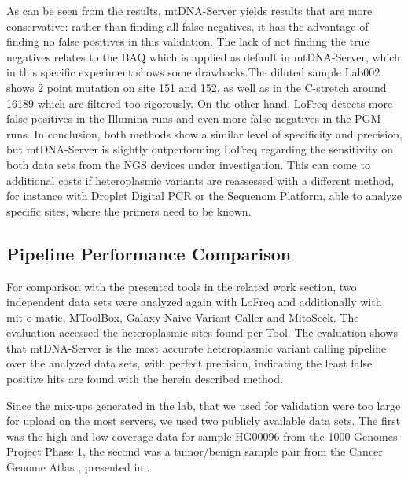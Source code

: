 As can be seen from the results, mtDNA-Server yields results that are more conservative: rather than finding all false negatives, it has the advantage of finding no false positives in this validation. The lack of not finding the true negatives relates to the BAQ which is applied as default in mtDNA-Server, which in this specific experiment shows some drawbacks.The diluted sample Lab002 shows 2 point mutation on site 151 and 152, as well as in the C-stretch around 16189 which are filtered too rigorously. On the other hand, LoFreq detects more false positives in the Illumina runs and even more false negatives in the PGM runs. In conclusion, both methods show a similar level of specificity and precision, but mtDNA-Server is slightly outperforming LoFreq regarding the sensitivity on both data sets from the NGS devices under investigation. This can come to additional costs if heteroplasmic variants are reassessed with a different method, for instance with Droplet Digital PCR or the Sequenom Platform, able to analyze specific sites, where the primers need to be known. 
\subsection{ Pipeline Performance Comparison }
For comparison with the presented tools in the related work section, two independent data sets were analyzed again with LoFreq and additionally with mit-o-matic, MToolBox, Galaxy Naive Variant Caller and  MitoSeek. The evaluation accessed the heteroplasmic sites found per Tool. The evaluation shows that mtDNA-Server is the most accurate heteroplasmic variant calling pipeline over the analyzed data sets, with perfect precision, indicating the least false positive hits are found with the herein described method.

Since the mix-ups generated in the lab, that we used for validation were too large for upload on the most servers, we used two publicly available data sets. The first was the high and low coverage data for sample HG00096 from the 1000 Genomes Project Phase 1, the second was a tumor/benign sample pair from the Cancer Genome Atlas \cite{Chang2013}, presented in \cite{Guo2013}.

